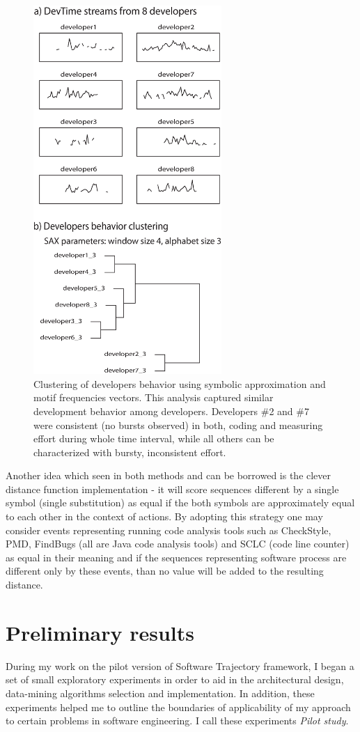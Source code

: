 \documentclass{sig-alternate}
\begin{document}
\begin{figure}[tp]
   \centering
   \includegraphics[height=140mm]{dev_clustering_vertical.eps}
   \caption{Clustering of developers behavior using symbolic approximation and motif frequencies vectors. This analysis captured similar development behavior among developers. Developers \#2 and \#7 were consistent (no bursts observed) in both, coding and measuring effort during whole time interval, while all others can be characterized with bursty, inconsistent effort.}
   \label{fig:cluster_developers}
\end{figure}

Another idea which seen in both methods and can be borrowed is the clever distance function implementation - it will score sequences different by a single symbol (single substitution) as equal if the both symbols are approximately equal to each other in the context of actions. By adopting this strategy one may consider events representing running code analysis tools such as CheckStyle, PMD, FindBugs (all are Java code analysis tools) and SCLC (code line counter) as equal in their meaning and if the sequences representing software process are different only by these events, than no value will be added to the resulting distance.

\section{Preliminary results}\label{results}
During my work on the pilot version of Software Trajectory framework, I began a set of small exploratory experiments in order to aid in the architectural design, data-mining algorithms selection and implementation. In addition, these experiments helped me to outline the boundaries of applicability of my approach to certain problems in software engineering. I call these experiments \textit{Pilot study}.
\end{document}
